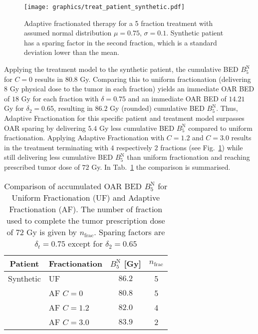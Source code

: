 \documentclass[\relativeRoot/ada.tex]{subfiles}
\begin{document}
\begin{figure}[!htb]
    \centering
    \texttt{[image: graphics/treat\_patient\_synthetic.pdf]}
    \caption{Adaptive fractionated therapy for a 5 fraction treatment with assumed normal distribution $\mu=0.75$, $\sigma=0.1$. Synthetic patient has a sparing factor in the second fraction, which is a standard deviation lower than the mean.}
    \label{fig:treat_patient_synthetic}
\end{figure}

Applying the treatment model to the synthetic patient, the cumulative BED $B_5^{\text{N}}$ for $C=0$ results in $80.8$ Gy. Comparing this to uniform fractionation (delivering $8$ Gy physical dose to the tumor in each fraction) yields an immediate OAR BED of $18$ Gy for each fraction with $\delta=0.75$ and an immediate OAR BED of $14.21$ Gy for $\delta_2=0.65$, resulting in $86.2$ Gy (rounded) cumulative BED $B_5^{\text{N}}$. Thus, Adaptive Fractionation for this specific patient and treatment model surpasses OAR sparing by delivering $5.4$ Gy less cumulative BED $B_5^{\text{N}}$ compared to uniform fractionation. Applying Adaptive Fractionation with $C=1.2$ and $C=3.0$ results in the treatment terminating with $4$ respectively $2$ fractions (see Fig.~\ref{fig:treat_patient_synthetic}) while still delivering less cumulative BED $B_5^{\text{N}}$ than uniform fractionation and reaching prescribed tumor dose of $72$ Gy. In Tab.~\ref{tab:result_treat_fraction_4} the comparison is summarised.

\begin{table}[!htb]
    \centering
    \caption{Comparison of accumulated OAR BED $B_5^{\text{N}}$ for Uniform Fractionation (UF) and Adaptive Fractionation (AF). The number of fraction used to complete the tumor prescription dose of $72$ Gy is given by $n_{\text{frac}}$. Sparing factors are $\delta_t=0.75$ except for $\delta_2=0.65$}
    \begin{tabular}{cl|cc}
    \toprule
        Patient & Fractionation & $B_5^{\text{N}}$ [Gy] & $n_{\text{frac}}$ \\
    \midrule
        Synthetic   & UF &  $86.2$ & 5 \\
                    & AF $C=0$ & $80.8$ & 5 \\
                    & AF $C=1.2$ & $82.0$ & 4 \\
                    & AF $C=3.0$ & $83.9$ & 2 \\
     
    \bottomrule
    \end{tabular}
    \label{tab:result_treat_fraction_4}
\end{table}
\end{document}
